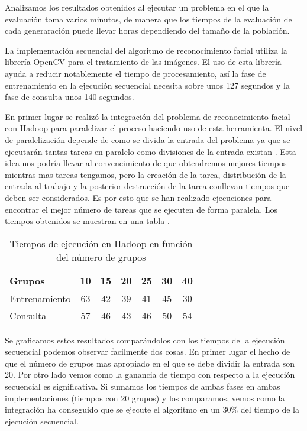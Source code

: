 \label{resultados-facerecognition}

Analizamos los resultados obtenidos al ejecutar un problema en el que la evaluación toma varios minutos, de manera que los tiempos de la evaluación de cada generaraci\'on puede llevar horas dependiendo del tamaño de la población.

La implementaci\'on secuencial del algoritmo de reconocimiento facial utiliza la librer\'ia OpenCV para el tratamiento de las im\'agenes. El uso de esta librer\'ia ayuda a reducir notablemente el tiempo de procesamiento, as\'i la fase de entrenamiento en la ejecuci\'on secuencial necesita sobre unos 127 segundos y la fase de consulta unos 140 segundos. 

En primer lugar se realiz\'o la integraci\'on del problema de reconocimiento facial con Hadoop para paralelizar el proceso haciendo uso de esta herramienta. El nivel de paralelizaci\'on depende de como se divida la entrada del problema ya que se ejecutar\'an tantas tareas en paralelo como divisiones de la entrada existan . Esta idea nos podr\'ia llevar al convencimiento de que obtendremos mejores tiempos mientras mas tareas tengamos, pero la creaci\'on de la tarea, distribuci\'on de la entrada al trabajo y la posterior destrucci\'on de la tarea conllevan tiempos que deben ser considerados. Es por esto que se han realizado ejecuciones para encontrar el mejor n\'umero de tareas que se ejecuten de forma paralela. Los tiempos obtenidos se muestran en una tabla .

\begin{table}[H]
  \begin{center}
    \begin{center}
    \begin{tabular}{l | c c c c c c}
    Grupos & 10 & 15 & 20 & 25 & 30 & 40 \\ \hline
    Entrenamiento & 63 & 42 & 39 & 41 & 45 & 30\\
    Consulta & 57 & 46 & 43 & 46 & 50 & 54\\
    \end{tabular}
    \end{center}
    \caption{Tiempos de ejecución en Hadoop en funci\'on del n\'umero de grupos}
    \label{tabla-tiempos-num-grupos}
  \end{center}
\end{table}

Se graficamos estos resultados  compar\'andolos con los tiempos de la ejecuci\'on secuencial podemos observar facilmente dos cosas. En primer lugar el hecho de que el n\'umero de grupos mas apropiado en el que se debe dividir la entrada son 20. Por otro lado vemos como la ganancia de tiempo con respecto a la ejecuci\'on secuencial es significativa. Si sumamos los tiempos de ambas fases en ambas implementaciones (tiempos con 20 grupos) y los comparamos, vemos como la integraci\'on ha conseguido que se ejecute el algoritmo en un 30\% del tiempo de la ejecuci\'on secuencial.

